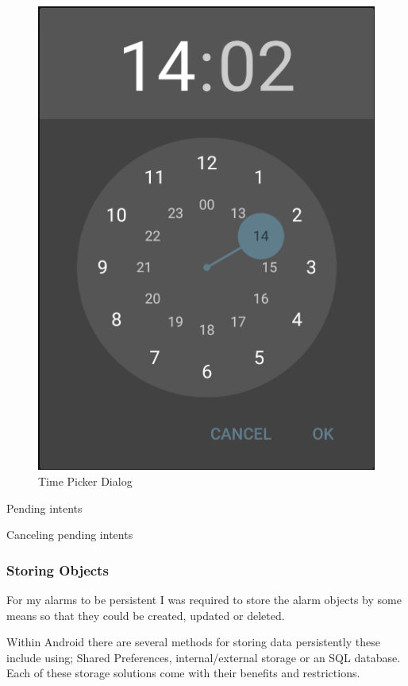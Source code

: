\begin{center}
  \begin{figure}
    \includegraphics[scale=0.10,keepaspectratio]{Images/components_pickers_time.png}
    \caption{Time Picker Dialog}
  \end{figure}
\end{center}

Pending intents

Canceling pending intents

\subsubsection{Storing Objects}\label{storing-objects}

For my alarms to be persistent I was required to store the alarm objects
by some means so that they could be created, updated or deleted.

Within Android there are several methods for storing data persistently
these include using; Shared Preferences, internal/external storage or an
SQL database. Each of these storage solutions come with their benefits
and restrictions.

